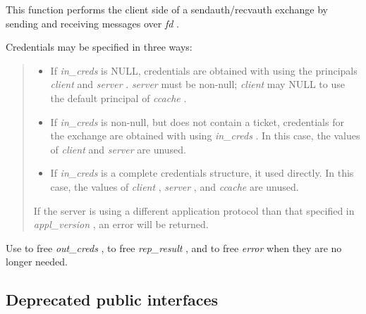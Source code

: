 \documentclass[letterpaper,10pt,english]{sphinxmanual}
\begin{document}
This function performs the client side of a sendauth/recvauth exchange by sending and receiving messages over \emph{fd} .

Credentials may be specified in three ways:
\begin{quote}
\begin{itemize}
\item {} 
If \emph{in\_creds} is NULL, credentials are obtained with {\hyperref[appdev/refs/api/krb5_get_credentials:c.krb5_get_credentials]{}} using the principals \emph{client} and \emph{server} . \emph{server} must be non-null; \emph{client} may NULL to use the default principal of \emph{ccache} .

\item {} 
If \emph{in\_creds} is non-null, but does not contain a ticket, credentials for the exchange are obtained with {\hyperref[appdev/refs/api/krb5_get_credentials:c.krb5_get_credentials]{}} using \emph{in\_creds} . In this case, the values of \emph{client} and \emph{server} are unused.

\item {} 
If \emph{in\_creds} is a complete credentials structure, it used directly. In this case, the values of \emph{client} , \emph{server} , and \emph{ccache} are unused.

\end{itemize}

If the server is using a different application protocol than that specified in \emph{appl\_version} , an error will be returned.
\end{quote}

Use {\hyperref[appdev/refs/api/krb5_free_creds:c.krb5_free_creds]{}} to free \emph{out\_creds} , {\hyperref[appdev/refs/api/krb5_free_ap_rep_enc_part:c.krb5_free_ap_rep_enc_part]{}} to free \emph{rep\_result} , and {\hyperref[appdev/refs/api/krb5_free_error:c.krb5_free_error]{}} to free \emph{error} when they are no longer needed.




{\hyperref[appdev/refs/api/krb5_recvauth:c.krb5_recvauth]{}}




\subsection{Deprecated public interfaces}
\label{appdev/refs/api/index:deprecated-public-interfaces}
\end{document}
